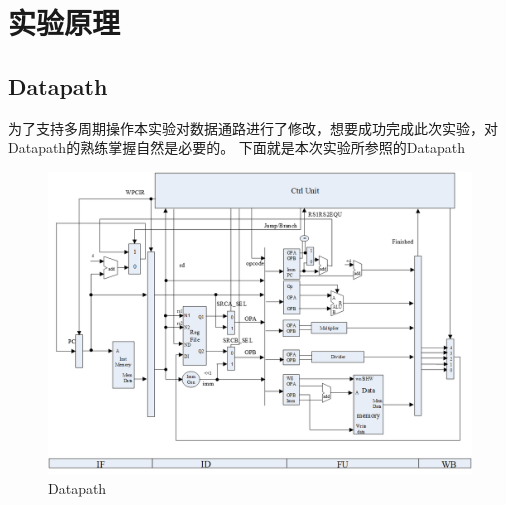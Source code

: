 
\section{实验原理}
\subsection{Datapath}
为了支持多周期操作本实验对数据通路进行了修改，想要成功完成此次实验，对Datapath的熟练掌握自然是必要的。
下面就是本次实验所参照的Datapath

\begin{figure}[H] %
	\centering %
	\includegraphics[width=1.0\textwidth]{figs/DataPath.png} %
	\caption{Datapath} %
	\label{Fig.1} %
\end{figure}

